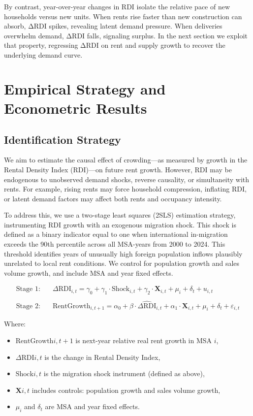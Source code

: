 \documentclass[APA,Times1COL]{WileyNJDv5} %
\begin{document}
By contrast, year-over-year changes in RDI isolate the relative pace of new households versus new units. When rents rise faster than new construction can absorb, ΔRDI spikes, revealing latent demand pressure. When deliveries overwhelm demand, ΔRDI falls, signaling surplus. In the next section we exploit that property, regressing ΔRDI on rent and supply growth to recover the underlying demand curve.

\section{Empirical Strategy and Econometric Results}

\subsection{Identification Strategy}
We aim to estimate the causal effect of crowding---as measured by growth in the Rental Density Index (RDI)---on future rent growth. However, RDI may be endogenous to unobserved demand shocks, reverse causality, or simultaneity with rents. For example, rising rents may force household compression, inflating RDI, or latent demand factors may affect both rents and occupancy intensity.

To address this, we use a two-stage least squares (2SLS) estimation strategy, instrumenting RDI growth with an exogenous migration shock. This shock is defined as a binary indicator equal to one when international in-migration exceeds the 90th percentile across all MSA-years from 2000 to 2024. This threshold identifies years of unusually high foreign population inflows plausibly unrelated to local rent conditions. We control for population growth and sales volume growth, and include MSA and year fixed effects.

\begin{align*}
	\text{Stage 1:}\quad & \Delta \text{RDI}_{i,t} = \gamma_0 + \gamma_1 \cdot \text{Shock}_{i,t} + \gamma_2 \cdot \textbf{X}_{i,t} + \mu_i + \delta_t + u_{i,t} \\\\
	\text{Stage 2:}\quad & \text{RentGrowth}_{i,t+1} = \alpha_0 + \beta \cdot \widehat{\Delta \text{RDI}}_{i,t} + \alpha_1 \cdot \textbf{X}_{i,t} + \mu_i + \delta_t + \varepsilon_{i,t}
\end{align*}

Where:
\begin{itemize}
	\item $\text{RentGrowth}{i,t+1}$ is next-year relative real rent growth in MSA $i$,
	\item $\Delta \text{RDI}{i,t}$ is the change in Rental Density Index,
	\item $\text{Shock}{i,t}$ is the migration shock instrument (defined as above),
	\item $\mathbf{X}{i,t}$ includes controls: population growth and sales volume growth,
	\item $\mu_i$ and $\delta_t$ are MSA and year fixed effects.
\end{itemize}
\end{document}
